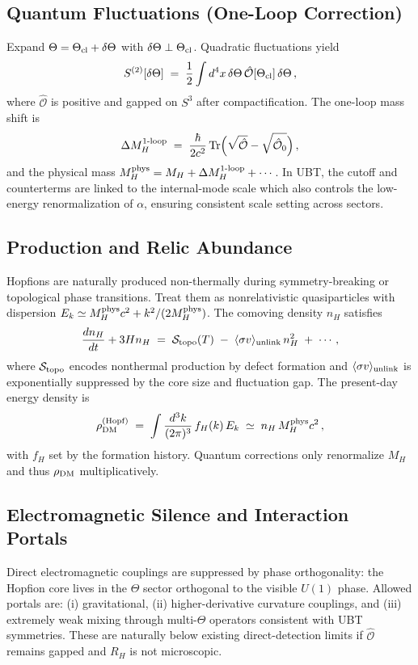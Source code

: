\subsection{Quantum Fluctuations (One-Loop Correction)}
Expand $\Theta=\Theta_{\rm cl}+\delta\Theta$ with $\delta\Theta\perp \Theta_{\rm cl}$. Quadratic fluctuations yield
\begin{equation}
S^{(2)}[\delta\Theta] \;=\; \frac{1}{2}\int d^4x\, \delta\Theta\,\hat{\mathcal{O}}[\Theta_{\rm cl}]\,\delta\Theta\,,
\end{equation}
where $\hat{\mathcal{O}}$ is positive and gapped on $S^3$ after compactification.
The one-loop mass shift is
\begin{equation}
\Delta M_{H}^{\rm 1\text{-}loop} \;=\; \frac{\hbar}{2c^2}\,\mathrm{Tr}\Big(\sqrt{\hat{\mathcal{O}}}-\sqrt{\hat{\mathcal{O}}_0}\Big)\,,
\end{equation}
and the physical mass $M_H^{\rm phys}=M_H+\Delta M_H^{\rm 1\text{-}loop}+\cdots$.
In UBT, the cutoff and counterterms are linked to the internal-mode scale which also controls the low-energy renormalization of $\alpha$,
ensuring consistent scale setting across sectors.

\subsection{Production and Relic Abundance}
Hopfions are naturally produced non-thermally during symmetry-breaking or topological phase transitions.
Treat them as nonrelativistic quasiparticles with dispersion $E_k\simeq M_H^{\rm phys}c^2 + k^2/(2M_H^{\rm phys})$.
The comoving density $n_H$ satisfies
\begin{equation}
\frac{dn_H}{dt}+3H n_H \;=\; \mathcal{S}_{\rm topo}(T)\;-\;\langle\sigma v\rangle_{\rm unlink}\, n_H^2 \;+\; \cdots,
\end{equation}
where $\mathcal{S}_{\rm topo}$ encodes nonthermal production by defect formation and $\langle\sigma v\rangle_{\rm unlink}$ is exponentially suppressed by the core size and fluctuation gap.
The present-day energy density is
\begin{equation}
\rho_{\rm DM}^{\rm (Hopf)} \;=\; \int \frac{d^3k}{(2\pi)^3}\, f_H(k)\, E_k
\;\simeq\; n_H\, M_H^{\rm phys}c^2\,,
\end{equation}
with $f_H$ set by the formation history. Quantum corrections only renormalize $M_H$ and thus $\rho_{\rm DM}$ multiplicatively.

\subsection{Electromagnetic Silence and Interaction Portals}
Direct electromagnetic couplings are suppressed by phase orthogonality: the Hopfion core lives in the $\Theta$ sector orthogonal to the visible $U(1)$ phase.
Allowed portals are: (i) gravitational, (ii) higher-derivative curvature couplings, and (iii) extremely weak mixing through multi-$\Theta$ operators consistent with UBT symmetries.
These are naturally below existing direct-detection limits if $\hat{\mathcal{O}}$ remains gapped and $R_H$ is not microscopic.

